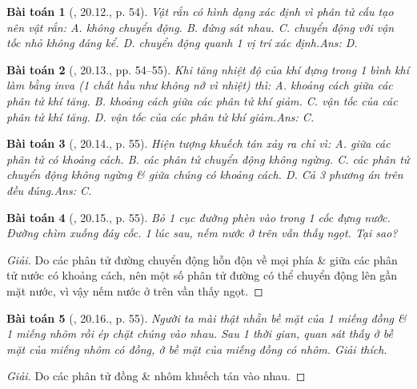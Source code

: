 \documentclass{article}
\newtheorem{baitoan}{Bài toán}
\begin{document}
\begin{baitoan}[\cite{SBT_Vat_Ly_8}, 20.12., p. 54]
	Vật rắn có hình dạng xác định vì phân tử cấu tạo nên vật rắn: {\sf A.} không chuyển động. {\sf B.} đứng sát nhau. {\sf C.} chuyển động với vận tốc nhỏ không đáng kể. {\sf D.} chuyển động quanh 1 vị trí xác định.\hfill{\sf Ans: D.}
\end{baitoan}

\begin{baitoan}[\cite{SBT_Vat_Ly_8}, 20.13., pp. 54--55]
	Khi tăng nhiệt độ của khí đựng trong 1 bình khí làm bằng inva (1 chất hầu như không nở vì nhiệt) thì: {\sf A.} khoảng cách giữa các phân tử khí tăng. {\sf B.} khoảng cách giữa các phân tử khí giảm. {\sf C.} vận tốc của các phân tử khí tăng. {\sf D.} vận tốc của các phân tử khí giảm.\hfill{\sf Ans: C.}
\end{baitoan}

\begin{baitoan}[\cite{SBT_Vat_Ly_8}, 20.14., p. 55]
	Hiện tượng khuếch tán xảy ra chỉ vì: {\sf A.} giữa các phân tử có khoảng cách. {\sf B.} các phân tử chuyển động không ngừng. {\sf C.} các phân tử chuyển động không ngừng \& giữa chúng có khoảng cách. {\sf D.} Cả 3 phương án trên đều đúng.\hfill{\sf Ans: C.}
\end{baitoan}

\begin{baitoan}[\cite{SBT_Vat_Ly_8}, 20.15., p. 55]
	Bỏ 1 cục đường phèn vào trong 1 cốc đựng nước. Đường chìm xuống đáy cốc. 1 lúc sau, nếm nước ở trên vẫn thấy ngọt. Tại sao?
\end{baitoan}

\begin{proof}[Giải]
	Do các phân tử đường chuyển động hỗn độn về mọi phía \& giữa các phân tử nước có khoảng cách, nên một số phân tử đường có thể chuyển động lên gần mặt nước, vì vậy nếm nước ở trên vần thấy ngọt.
\end{proof}

\begin{baitoan}[\cite{SBT_Vat_Ly_8}, 20.16., p. 55]
	Người ta mài thật nhẵn bề mặt của 1 miếng đồng \& 1 miếng nhôm rồi ép chặt chúng vào nhau. Sau 1 thời gian, quan sát thấy ở bề mặt của miếng nhôm có đồng, ở bề mặt của miếng đồng có nhôm. Giải thích.
\end{baitoan}

\begin{proof}[Giải]
	Do các phân tử đồng \& nhôm khuếch tán vào nhau.
\end{proof}
\end{document}
